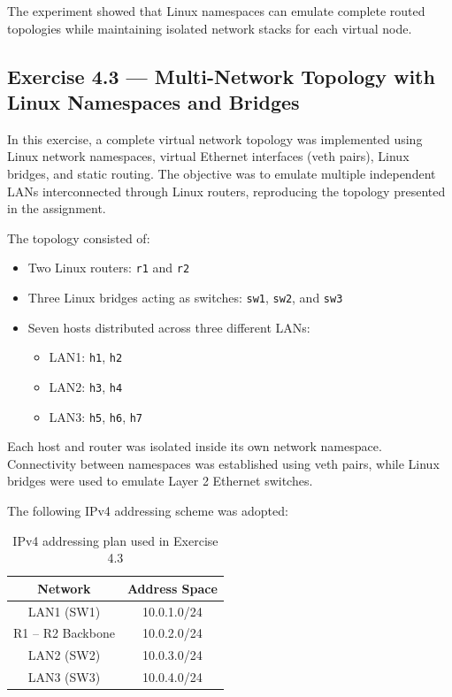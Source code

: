 \documentclass[12pt]{article}
\begin{document}
The experiment showed that Linux namespaces can emulate complete routed topologies while maintaining isolated network stacks for each virtual node.

\newpage

\subsection{Exercise 4.3 — Multi-Network Topology with Linux Namespaces and Bridges}

In this exercise, a complete virtual network topology was implemented using Linux network namespaces, virtual Ethernet interfaces (veth pairs), Linux bridges, and static routing. The objective was to emulate multiple independent LANs interconnected through Linux routers, reproducing the topology presented in the assignment.

The topology consisted of:
\begin{itemize}
    \item Two Linux routers: \texttt{r1} and \texttt{r2}
    \item Three Linux bridges acting as switches: \texttt{sw1}, \texttt{sw2}, and \texttt{sw3}
    \item Seven hosts distributed across three different LANs:
    \begin{itemize}
        \item LAN1: \texttt{h1}, \texttt{h2}
        \item LAN2: \texttt{h3}, \texttt{h4}
        \item LAN3: \texttt{h5}, \texttt{h6}, \texttt{h7}
    \end{itemize}
\end{itemize}

Each host and router was isolated inside its own network namespace. Connectivity between namespaces was established using veth pairs, while Linux bridges were used to emulate Layer 2 Ethernet switches.

The following IPv4 addressing scheme was adopted:

\begin{table}[H]
\centering
\begin{tabular}{|c|c|}
\hline
\textbf{Network} & \textbf{Address Space} \\ \hline
LAN1 (SW1) & 10.0.1.0/24 \\ \hline
R1 -- R2 Backbone & 10.0.2.0/24 \\ \hline
LAN2 (SW2) & 10.0.3.0/24 \\ \hline
LAN3 (SW3) & 10.0.4.0/24 \\ \hline
\end{tabular}
\caption{IPv4 addressing plan used in Exercise 4.3}
\end{table}
\end{document}
